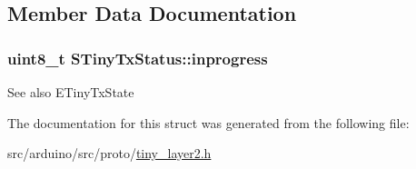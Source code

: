 \subsection{Member Data Documentation}
\hypertarget{structSTinyTxStatus_a8d7fa9861ba2adb1fd4ad4689548d238}{}
\subsubsection[{inprogress}]{\setlength{\rightskip}{0pt plus 5cm}uint8\+\_\+t S\+Tiny\+Tx\+Status\+::inprogress}\label{structSTinyTxStatus_a8d7fa9861ba2adb1fd4ad4689548d238}
\begin{DoxySeeAlso}{See also}
E\+Tiny\+Tx\+State 
\end{DoxySeeAlso}


The documentation for this struct was generated from the following file\+:\begin{DoxyCompactItemize}
\item 
src/arduino/src/proto/\hyperlink{src_2arduino_2src_2proto_2tiny__layer2_8h}{tiny\+\_\+layer2.\+h}\end{DoxyCompactItemize}
